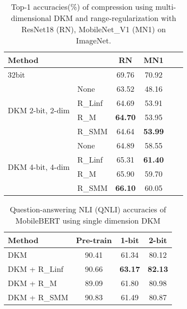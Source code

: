 \documentclass[10pt,twocolumn,letterpaper]{article}
\begin{document}
\begin{table}[t]
\caption{Top-1 accuracies(\%) of compression using multi-dimensional DKM and range-regularization with ResNet18 (RN), MobileNet\_V1 (MN1) on ImageNet.} \label{table_comp_exp_multi}
\vskip 0.15in
\begin{center}
\begin{small}
\begin{sc}
\begin{tabular}{llcccc}
\toprule
Method &  & RN & MN1 \\
\midrule
32bit &   & 69.76 & 70.92 \\
\midrule
\multirow{4}{*}{DKM 2-bit, 2-dim}    & None        & 63.52 & 48.16 \\
                        & R\_Linf    & 64.69 & 53.91 \\
                        & R\_M    &  \textbf{64.70} & 53.95\\
                        & R\_SMM    & 64.64 & \textbf{53.99}\\
                        \midrule
\multirow{4}{*}{DKM 4-bit, 4-dim}    & None        & 64.89 & 58.55\\
                        & R\_Linf    & 65.31 & \textbf{61.40}\\
                        & R\_M    & 65.90 & 59.70\\
                        & R\_SMM    & \textbf{66.10} & 60.05 \\
\bottomrule
\end{tabular}
\end{sc}
\end{small}
\end{center}
\vskip -0.1in
\end{table}









\begin{table}[t]
\caption{Question-answering NLI (QNLI) accuracies of MobileBERT using single dimension DKM}
\label{exp_mobilebert}
\vskip 0.15in
\begin{center}
\begin{small}
\begin{sc}
\begin{tabular}{lccc}
\toprule
Method &Pre-train & 1-bit & 2-bit \\
\midrule
DKM    & 90.41 & 61.34 & 80.12 \\
DKM + R\_Linf  & 90.66 & \textbf{63.17} & \textbf{82.13}        \\
DKM + R\_M  & 89.09 & 61.80 & 80.98        \\
DKM + R\_SMM & 90.83 & 61.49 & 80.87        \\
\bottomrule
\end{tabular}
\end{sc}
\end{small}
\end{center}
\vskip -0.1in
\end{table}
\end{document}
